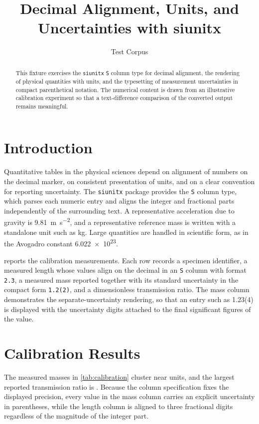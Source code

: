 \documentclass[11pt]{article}
\title{Decimal Alignment, Units, and Uncertainties with siunitx}
\author{Test Corpus}
\date{}
\begin{document}
\maketitle

\begin{abstract}
This fixture exercises the \texttt{siunitx} \texttt{S} column type for decimal
alignment, the rendering of physical quantities with units, and the typesetting
of measurement uncertainties in compact parenthetical notation. The numerical
content is drawn from an illustrative calibration experiment so that a
text-difference comparison of the converted output remains meaningful.
\end{abstract}

\section{Introduction}
\label{sec:introduction}

Quantitative tables in the physical sciences depend on alignment of numbers on
the decimal marker, on consistent presentation of units, and on a clear
convention for reporting uncertainty. The \texttt{siunitx} package provides the
\texttt{S} column type, which parses each numeric entry and aligns the integer
and fractional parts independently of the surrounding text. A representative
acceleration due to gravity is \SI{9.81}{\meter\per\second\squared}, and a
representative reference mass is written with a standalone unit such as
\si{\kilogram}. Large quantities are handled in scientific form, as in the
Avogadro constant \num{6.022e23}.

 reports the calibration measurements. Each row records a
specimen identifier, a measured length whose values align on the decimal in an
\texttt{S} column with format \texttt{2.3}, a measured mass reported together
with its standard uncertainty in the compact form \texttt{1.2(2)}, and a
dimensionless transmission ratio. The mass column demonstrates the
separate-uncertainty rendering, so that an entry such as 1.23(4) is displayed
with the uncertainty digits attached to the final significant figures of the
value.

\section{Calibration Results}
\label{sec:results}

The measured masses in \cref{tab:calibration} cluster near 
units, and the largest reported transmission ratio is . Because
the column specification fixes the displayed precision, every value in the mass
column carries an explicit uncertainty in parentheses, while the length column
is aligned to three fractional digits regardless of the magnitude of the
integer part.
\end{document}
